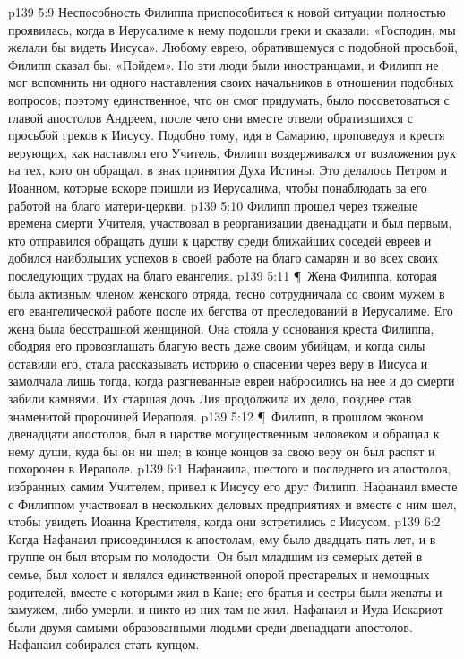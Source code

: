 \vs p139 5:9 Неспособность Филиппа приспособиться к новой ситуации полностью проявилась, когда в Иерусалиме к нему подошли греки и сказали: «Господин, мы желали бы видеть Иисуса». Любому еврею, обратившемуся с подобной просьбой, Филипп сказал бы: «Пойдем». Но эти люди были иностранцами, и Филипп не мог вспомнить ни одного наставления своих начальников в отношении подобных вопросов; поэтому единственное, что он смог придумать, было посоветоваться с главой апостолов Андреем, после чего они вместе отвели обратившихся с просьбой греков к Иисусу. Подобно тому, идя в Самарию, проповедуя и крестя верующих, как наставлял его Учитель, Филипп воздерживался от возложения рук на тех, кого он обращал, в знак принятия Духа Истины. Это делалось Петром и Иоанном, которые вскоре пришли из Иерусалима, чтобы понаблюдать за его работой на благо матери\hyp{}церкви.
\vs p139 5:10 Филипп прошел через тяжелые времена смерти Учителя, участвовал в реорганизации двенадцати и был первым, кто отправился обращать души к царству среди ближайших соседей евреев и добился наибольших успехов в своей работе на благо самарян и во всех своих последующих трудах на благо евангелия.
\vs p139 5:11 \P\ Жена Филиппа, которая была активным членом женского отряда, тесно сотрудничала со своим мужем в его евангелической работе после их бегства от преследований в Иерусалиме. Его жена была бесстрашной женщиной. Она стояла у основания креста Филиппа, ободряя его провозглашать благую весть даже своим убийцам, и когда силы оставили его, стала рассказывать историю о спасении через веру в Иисуса и замолчала лишь тогда, когда разгневанные евреи набросились на нее и до смерти забили камнями. Их старшая дочь Лия продолжила их дело, позднее став знаменитой пророчицей Иераполя.
\vs p139 5:12 \P\ Филипп, в прошлом эконом двенадцати апостолов, был в царстве могущественным человеком и обращал к нему души, куда бы он ни шел; в конце концов за свою веру он был распят и похоронен в Иераполе.
\vs p139 6:1 Нафанаила, шестого и последнего из апостолов, избранных самим Учителем, привел к Иисусу его друг Филипп. Нафанаил вместе с Филиппом участвовал в нескольких деловых предприятиях и вместе с ним шел, чтобы увидеть Иоанна Крестителя, когда они встретились с Иисусом.
\vs p139 6:2 Когда Нафанаил присоединился к апостолам, ему было двадцать пять лет, и в группе он был вторым по молодости. Он был младшим из семерых детей в семье, был холост и являлся единственной опорой престарелых и немощных родителей, вместе с которыми жил в Кане; его братья и сестры были женаты и замужем, либо умерли, и никто из них там не жил. Нафанаил и Иуда Искариот были двумя самыми образованными людьми среди двенадцати апостолов. Нафанаил собирался стать купцом.
